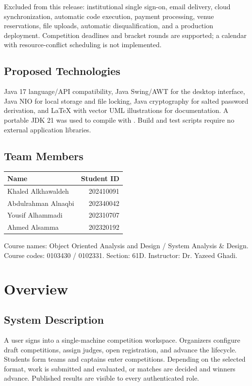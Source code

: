\documentclass[12pt]{article}
\begin{document}
Excluded from this release: institutional single sign-on, email delivery, cloud synchronization, automatic code execution, payment processing, venue reservations, file uploads, automatic disqualification, and a production deployment. Competition deadlines and bracket rounds are supported; a calendar with resource-conflict scheduling is not implemented.
\subsection{Proposed Technologies}
Java 17 language/API compatibility, Java Swing/AWT for the desktop interface, Java NIO for local storage and file locking, Java cryptography for salted password derivation, and LaTeX with vector UML illustrations for documentation. A portable JDK 21 was used to compile with . Build and test scripts require no external application libraries.
\subsection{Team Members}
\begin{tabularx}{\linewidth}{Yr}\toprule Name & Student ID\\\midrule
Khaled Alkhawaldeh & 202410091\\ Abdulrahman Alnaqbi & 202340042\\ Yousif Alhammadi & 202310707\\ Ahmed Alsamma & 202320192\\\bottomrule\end{tabularx}
Course names: Object Oriented Analysis and Design / System Analysis \& Design. Course codes: 0103430 / 0102331. Section: 61D. Instructor: Dr. Yazeed Ghadi.

\section{Overview}
\subsection{System Description}
A user signs into a single-machine competition workspace. Organizers configure draft competitions, assign judges, open registration, and advance the lifecycle. Students form teams and captains enter competitions. Depending on the selected format, work is submitted and evaluated, or matches are decided and winners advance. Published results are visible to every authenticated role.
\end{document}
